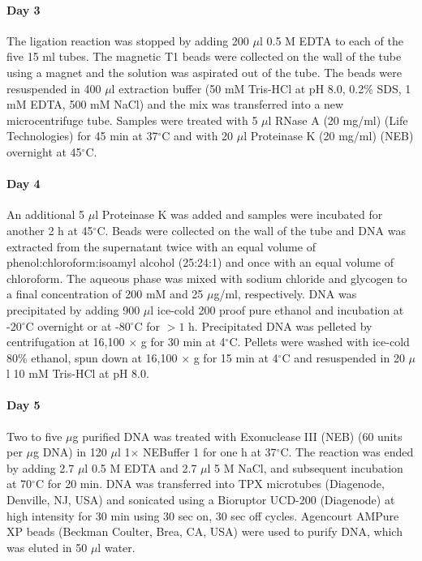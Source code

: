 \paragraph{Day 3}
The ligation reaction was stopped by adding 200 $\mu$l 0.5 M EDTA to each
of the five 15 ml tubes. The magnetic T1 beads were collected on the
wall of the tube using a magnet and the solution was aspirated out of
the tube. The beads were resuspended in 400 $\mu$l extraction buffer (50
mM Tris-HCl at pH 8.0, 0.2\% SDS, 1 mM EDTA, 500 mM NaCl) and the mix
was transferred into a new microcentrifuge tube. Samples were treated
with 5 $\mu$l RNase A (20 mg/ml) (Life Technologies) for 45 min at 37$^\circ$C
and with 20 $\mu$l Proteinase K (20 mg/ml) (NEB) overnight at 45$^\circ$C.

\paragraph{Day 4}
An additional 5 $\mu$l Proteinase K was added and samples were incubated
for another 2 h at 45$^\circ$C. Beads were collected on the wall of the tube
and DNA was extracted from the supernatant twice with an equal volume
of phenol:chloroform:isoamyl alcohol (25:24:1) and once with an equal
volume of chloroform. The aqueous phase was mixed with sodium chloride
and glycogen to a final concentration of 200 mM and 25 $\mu$g/ml,
respectively. DNA was precipitated by adding 900 $\mu$l ice-cold 200 proof
pure ethanol and incubation at -20$^\circ$C overnight or at -80$^\circ$C for
$>1$ h. Precipitated DNA was pelleted by centrifugation at 16,100 $\times$ g
for 30 min at 4$^\circ$C. Pellets were washed with ice-cold 80\% ethanol,
spun down at 16,100 $\times$ g for 15 min at 4$^\circ$C and resuspended in 20 $\mu$l 10
mM Tris-HCl at pH 8.0.

\paragraph{Day 5}
Two to five $\mu$g purified DNA was treated with Exonuclease III (NEB) (60
units per $\mu$g DNA) in 120 $\mu$l 1$\times$ NEBuffer 1 for one h at 37$^\circ$C. The
reaction was ended by adding 2.7 $\mu$l 0.5 M EDTA and 2.7 $\mu$l 5 M NaCl,
and subsequent incubation at 70$^\circ$C for 20 min. DNA was transferred into
TPX microtubes (Diagenode, Denville, NJ, USA) and sonicated using a
Bioruptor UCD-200 (Diagenode) at high intensity for 30 min using 30
sec on, 30 sec off cycles. Agencourt AMPure XP beads (Beckman Coulter,
Brea, CA, USA) were used to purify DNA, which was eluted in 50 $\mu$l
water.

